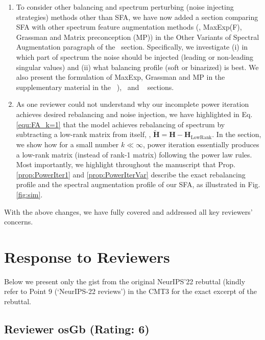 \begin{enumerate}
    
    \item To consider other balancing and spectrum perturbing (noise injecting strategies) methods other than SFA, we have now added a section comparing SFA with other spectrum feature augmentation methods (\ie, MaxExp(F), Grassman and Matrix preconception (MP)) in the {\color{blue} Other Variants of Spectral Augmentation} paragraph  of the~ section. Specifically, we investigate (i) in which part of spectrum the noise should be injected (leading or non-leading singular values) and (ii) what balancing profile (soft or binarized)  is best. 
    We also present the formulation of MaxExp, Grassman and MP in the supplementary material in the ~),~ and ~ sections.
    
    
    \item As one reviewer could not understand why our incomplete power iteration achieves desired rebalancing and noise injection, we have highlighted in Eq. \eqref{equ:FA_k=1} that the model achieves rebalancing of spectrum by subtracting a low-rank matrix from itself, \ie, $\widetilde{\mathbf{H}} \!=\! \mathbf{H}\! -\!\mathbf{H}_{\text{LowRank}}$. In the  section, we show how for a small number $k\ll\infty$, power iteration essentially produces a low-rank matrix (instead of rank-1 matrix) following the power law rules. Most importantly, we highlight throughout the manuscript that Prop. \ref{prop:PowerIter1} and \ref{prop:PowerIterVar} describe the exact rebalancing profile and the spectral augmentation profile of our SFA, as illustrated in Fig. \ref{fig:sim}.
\end{enumerate}

{\color{teal}With the above changes, we have fully covered and addressed all key reviewers' concerns. %
}

\section{Response to Reviewers}

\vspace{0.4cm}
{\color{teal} Below we present only the gist from the original NeurIPS'22 rebuttal (kindly refer to Point 9 (`NeurIPS-22 reviews') in the CMT3 for the exact excerpt of the rebuttal.}

\vspace{0.4cm}
\subsection{Reviewer osGb (Rating: 6)}

